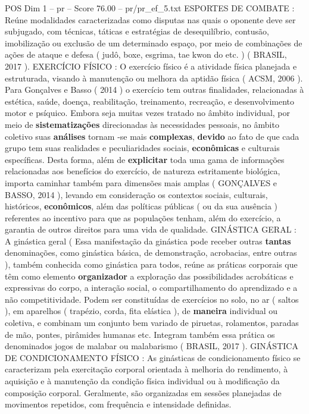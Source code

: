 \begin{textsample}{POS Dim 1 – pr – Score 76.00 – pr/pr\_ef\_5.txt}
ESPORTES DE COMBATE : Reúne modalidades caracterizadas como disputas nas quais o oponente deve ser subjugado, com técnicas, táticas e estratégias de desequilíbrio, contusão, imobilização ou exclusão de um determinado espaço, por meio de combinações de ações de ataque e defesa ( judô, boxe, esgrima, tae kwon do etc. ) ( BRASIL, 2017 ).
EXERCÍCIO FÍSICO : O exercício físico é a atividade física planejada e estruturada, visando à manutenção ou melhora da aptidão física ( ACSM, 2006 ).
Para Gonçalves e Basso ( 2014 ) o exercício tem outras finalidades, relacionadas à estética, saúde, doença, reabilitação, treinamento, recreação, e desenvolvimento motor e psíquico.
Embora seja muitas vezes tratado no âmbito individual, por meio de \textbf{sistematizações} direcionadas às necessidades pessoais, no âmbito coletivo suas \textbf{análises} tornam -se mais \textbf{complexas}, \textbf{devido} ao fato de que cada grupo tem suas realidades e peculiaridades sociais, \textbf{econômicas} e culturais específicas.
Desta forma, além de \textbf{explicitar} toda uma gama de informações relacionadas aos benefícios do exercício, de natureza estritamente biológica, importa caminhar também para dimensões mais amplas ( GONÇALVES e BASSO, 2014 ), levando em consideração os contextos sociais, culturais, históricos, \textbf{econômicos}, além das políticas públicas ( ou da sua ausência ) referentes ao incentivo para que as populações tenham, além do exercício, a garantia de outros direitos para uma vida de qualidade.
GINÁSTICA GERAL : A ginástica geral ( Essa manifestação da ginástica pode receber outras \textbf{tantas} denominações, como ginástica básica, de demonstração, acrobacias, entre outras ), também conhecida como ginástica para todos, reúne as práticas corporais que têm como elemento \textbf{organizador} a exploração das possibilidades acrobáticas e expressivas do corpo, a interação social, o compartilhamento do aprendizado e a não competitividade.
Podem ser constituídas de exercícios no solo, no ar ( saltos ), em aparelhos ( trapézio, corda, fita elástica ), de \textbf{maneira} individual ou coletiva, e combinam um conjunto bem variado de piruetas, rolamentos, paradas de mão, pontes, pirâmides humanas etc.
Integram também essa prática os denominados jogos de malabar ou malabarismo ( BRASIL, 2017 ).
GINÁSTICA DE CONDICIONAMENTO FÍSICO : As ginásticas de condicionamento físico se caracterizam pela exercitação corporal orientada à melhoria do rendimento, à aquisição e à manutenção da condição física individual ou à modificação da composição corporal.
Geralmente, são organizadas em sessões planejadas de movimentos repetidos, com frequência e intensidade definidas.

\end{textsample}

